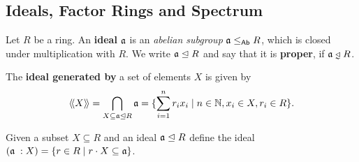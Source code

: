 	\newpage
	\subsection{Ideals, Factor Rings and Spectrum}
	\begin{definition}
		Let $R$ be a ring. An \textbf{ideal} $\mathfrak{a}$ is an \textit{abelian subgroup} $\mathfrak{a} \leq_{\textsf{Ab}} R$, which is closed under multiplication with $R$. We write $\mathfrak{a} \trianglelefteq R$ and say that it is \textbf{proper}, if $\ideal{a} \divneq R$.

		The \textbf{ideal generated by} a set of elements $X$ is given by 
		\begin{equation*}
			\langle\!\langle X \rangle\!\rangle = \bigcap \limits_{X \subseteq \mathfrak{a} \trianglelefteq R} \mathfrak{a} = \{\sum \limits_{i=1}^n r_ix_i \mid n \in \mathbb{N}, x_i \in X, r_i \in R\}.
		\end{equation*}
	\end{definition}

	Given a subset $X \subseteq R$ and an ideal $\mathfrak{a}\trianglelefteq R$ define the ideal $(\mathfrak{a}\;:X) = \{r \in R \mid r\cdot X \subseteq \mathfrak{a}\}$. 

